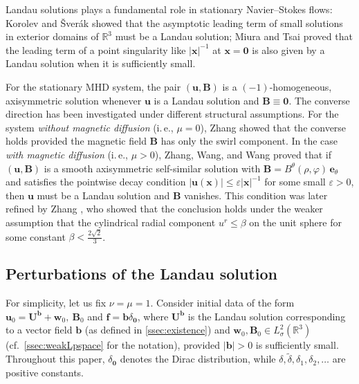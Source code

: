 \documentclass[10pt]{amsart}
\theoremstyle{plain}
\theoremstyle{definition}
\theoremstyle{remark}
\numberwithin{equation}{section}
\newcommand{\bx}{\boldsymbol{x}}
\newcommand{\bb}{{\boldsymbol{b}}}
\newcommand{\bu}{{\boldsymbol{u}}}
\newcommand{\bU}{{\boldsymbol{U}}}
\newcommand{\bw}{{\boldsymbol{w}}}
\newcommand{\bB}{{\boldsymbol{B}}}
\newcommand{\Bf}{{\boldsymbol{f}}}
\begin{document}
Landau solutions plays a fundamental role in stationary Navier--Stokes flows: Korolev and \v{S}ver\'{a}k \cite{KorolevSverak2011} showed that the asymptotic leading term of small solutions in exterior domains of $\mathbb{R}^3$ must be a Landau solution; Miura and Tsai \cite{MiuraTsai2012} proved that the leading term of a point singularity like $|\bx|^{-1}$ at $\bx=\mathbf0$ is also given by a Landau solution when it is sufficiently small.

For the stationary MHD system, the pair $(\bu, \bB)$ is a $(-1)$-homogeneous, axisymmetric solution whenever $\bu$ is a Landau solution and $\bB \equiv \boldsymbol 0$. The converse direction has been investigated under different structural assumptions. For the system \textit{without magnetic diffusion} (i.\,e., $\mu=0$), Zhang \cite{Zhang2025MHDwithoutMD} showed that the converse holds provided the magnetic field $\bB$ has only the swirl component. In the case \textit{with magnetic diffusion} (i.\,e., $\mu >0$), Zhang, Wang, and Wang \cite{ZhangWangWang2026} proved that if $(\bu, \bB)$ is a smooth axisymmetric self-similar solution with $\bB = B^\theta(\rho, \varphi) \, \boldsymbol{e}_\theta$ and satisfies the pointwise decay condition $|\bu(\bx)| \leq \varepsilon |\bx|^{-1}$ for some small $\varepsilon > 0$, then $\boldsymbol{u}$ must be a Landau solution and $\boldsymbol{B}$ vanishes. 
This condition was later refined by Zhang \cite{Zhang2025MHDwithMD}, who showed that the conclusion holds under the weaker assumption that the cylindrical radial component $u^r \le \beta$ on the unit sphere for some constant $\beta < \frac{2\sqrt{2}}{3}$.


\subsection{Perturbations of the Landau solution}\label{ssec:perturb-setting}

For simplicity, let us fix $\nu=\mu=1$. Consider initial data of the form $\bu_0=\bU^\bb+\bw_0,\ \bB_0$ and $\Bf=\bb\delta_{\mathbf{0}}$, where $\bU^\bb$ is the Landau solution corresponding to a vector field $\bb$ (as defined in \cref{ssec:existence}) and $\bw_0, \bB_0 \in L^2_{\sigma}(\mathbb{R}^3)$ (cf.~\cref{ssec:weakLpspace} for the notation), provided $|\bb|>0$ is sufficiently small.
Throughout this paper, $\delta_{\mathbf{0}}$ denotes the Dirac distribution, while $
\delta, \tilde \delta,  \delta_1,\delta_2,\dots$ are positive constants.


\end{document}
